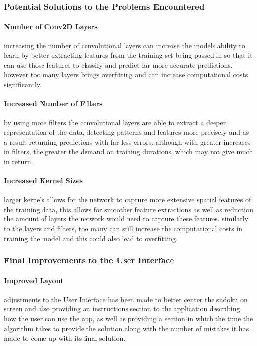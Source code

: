 \documentclass[]{final_report}
\begin{document}
\subsubsection{Potential Solutions to the Problems Encountered}

\paragraph{Number of Conv2D Layers}
increasing the number of convolutional layers can increase the models ability to learn by better extracting features from the training set being passed in so that it can use those features to classify and predict far more accurate predictions. however too many layers brings overfitting and can increase computational costs significantly.

\paragraph{Increased Number of Filters}
by using more filters the convolutional layers are able to extract a deeper representation of the data, detecting patterns and features more precisely and as a result returning predictions with far less errors. although with greater increases in filters, the greater the demand on training durations, which may not give much in return.

\paragraph{Increased Kernel Sizes}
larger kernels allows for the network to capture more extensive spatial features of the training data, this allows for smoother feature extractions as well as reduction the amount of layers the network would need to capture these features. similarly to the layers and filters, too many can still increase the computational costs in training the model and this could also lead to overfitting.

\subsubsection{Final Improvements to the User Interface}

\paragraph{Improved Layout}
adjustments to the User Interface has been made to better center the sudoku on screen and also providing an instructions section to the application describing how the user can use the app, as well as providing a section in which the time the algorithm takes to provide the solution along with the number of mistakes it has made to come up with its final solution.
\end{document}
